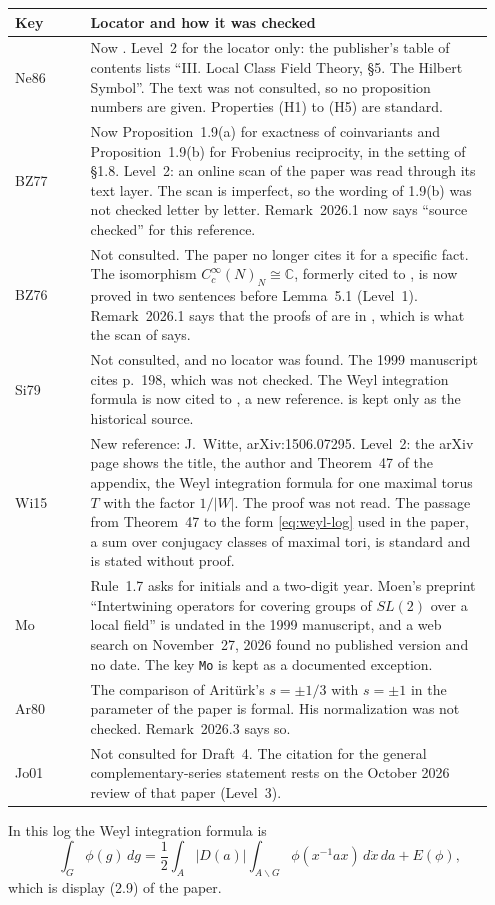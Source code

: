 \documentclass[12pt,letterpaper]{article}
\begin{document}
\begin{longtable}{@{}>{\raggedright\arraybackslash}p{0.15\linewidth}>{\raggedright\arraybackslash}p{0.80\linewidth}@{}}
\toprule
Key & Locator and how it was checked\\
\midrule
\endhead
Ne86 & Now \cite[Ch.~III, \S5]{Ne86}. Level~2 for the locator only: the
publisher's table of contents lists ``III. Local Class Field Theory,
\S5. The Hilbert Symbol''. The text was not consulted, so no
proposition numbers are given. Properties (H1) to (H5) are standard.\\
BZ77 & Now Proposition~1.9(a) for exactness of coinvariants and
Proposition~1.9(b) for Frobenius reciprocity, in the setting of \S1.8.
Level~2: an online scan of the paper was read through its text layer.
The scan is imperfect, so the wording of 1.9(b) was not checked letter
by letter. Remark~2026.1 now says ``source checked'' for this
reference.\\
BZ76 & Not consulted. The paper no longer cites it for a specific
fact. The isomorphism $C_c^\infty(N)_N\cong\mathbb C$, formerly cited to
\cite{BZ76,BZ77}, is now proved in two sentences before
Lemma~5.1 (Level~1). Remark~2026.1 says that the proofs of
\cite[Prop.~1.9]{BZ77} are in \cite{BZ76}, which is what the scan of
\cite{BZ77} says.\\
Si79 & Not consulted, and no locator was found. The 1999 manuscript
cites p.~198, which was not checked. The Weyl integration formula is
now cited to \cite[Theorem~47]{Wi15}, a new reference. \cite{Si79} is
kept only as the historical source.\\
Wi15 & New reference: J.~Witte, arXiv:1506.07295. Level~2: the arXiv
page shows the title, the author and Theorem~47 of the appendix, the
Weyl integration formula for one maximal torus $T$ with the factor
$1/|W|$. The proof was not read. The passage from Theorem~47 to the
form \eqref{eq:weyl-log} used in the paper, a sum over conjugacy classes of
maximal tori, is standard and is stated without proof.\\
Mo & Rule~1.7 asks for initials and a two-digit year. Moen's preprint
``Intertwining operators for covering groups of $SL(2)$ over a local
field'' is undated in the 1999 manuscript, and a web search on
November~27, 2026 found no published version and no date. The key
\texttt{Mo} is kept as a documented exception.\\
Ar80 & The comparison of Arit\"urk's $s=\pm1/3$ with $s=\pm1$ in the
parameter of the paper is formal. His normalization was not checked.
Remark~2026.3 says so.\\
Jo01 & Not consulted for Draft~4. The citation \cite[\S3]{Jo01} for the
general complementary-series statement rests on the October 2026 review
of that paper (Level~3).\\
\bottomrule
\end{longtable}
In this log the Weyl integration formula is
\begin{equation}\label{eq:weyl-log}
\int_G\phi(g)\,dg=\frac12\int_A|D(a)|\int_{A\backslash G}
\phi(x^{-1}ax)\,d\dot x\,da+E(\phi),
\end{equation}
which is display (2.9) of the paper.
\end{document}
